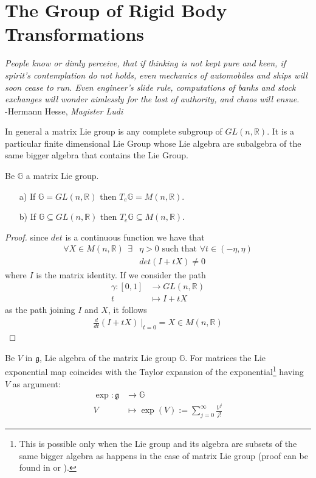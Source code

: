 
\chapter{The Group of Rigid Body Transformations}\label{ch:rigid_body_transformations}


\begin{flushright}
	\emph{People know or dimly perceive, that if thinking is not kept pure and keen, if spirit's contemplation do not holds, even mechanics of automobiles and ships will soon cease to run. Even engineer's slide rule, computations of banks and stock exchanges will wonder aimlessly for the lost of authority, and chaos will ensue.} \\ -Hermann Hesse, \emph{Magister Ludi}
\end{flushright}

In general a matrix Lie group is any complete subgroup of $GL(n,\mathbb{R})$. It is a particular finite dimensional Lie Group whose Lie algebra are subalgebra of the same bigger algebra that contains the Lie Group.
\begin{prop}\label{pr:matrixLiealgebra}
	Be $\mathbb{G}$ a matrix Lie group.
	\begin{itemize}
		\item[a)] If $\mathbb{G} = GL(n,\mathbb{R})$ then $T_{e}\mathbb{G} = M(n,\mathbb{R})$.  
		\item[b)] If $\mathbb{G} \subseteq GL(n,\mathbb{R})$ then $T_{e}\mathbb{G} \subseteq M(n,\mathbb{R})$.
	\end{itemize}
\end{prop}
\begin{proof}
	since $det$ is a continuous function we have that 
	\begin{align*}
	\forall X \in M(n,\mathbb{R})~~ \exists &\eta > 0 \text{ such that } \forall t \in(-\eta , \eta) \\
	&det(I+tX) \neq 0
	\end{align*}
	where $I$ is the matrix identity. If we consider the path
	\begin{align*}
	\gamma : [0,1] & \longrightarrow  GL(n,\mathbb{R}) \\
	t &\longmapsto I+tX
	\end{align*}
	as the path joining $I$ and $X$, it follows
	\begin{align*}
	\frac{d }{dt}(I+tX)~\Bigr|_{t = 0}  = X \in M(n,\mathbb{R})
	\end{align*}
\end{proof}

Be $V$ in $\mathfrak{g}$, Lie algebra of the matrix Lie group $\mathbb{G}$. For matrices the Lie exponential map coincides with the Taylor expansion of the exponential\footnote{This is possible only when the Lie group and its algebra are subsets of the same bigger algebra as happens in the case of matrix Lie group (proof can be found in \cite{kirillov} or \cite{hall}).} having $V$ as argument:
\begin{align*}
\exp : \mathfrak{g} & \longrightarrow  \mathbb{G}   \\
V &\longmapsto \exp(V) := \sum_{j=0}^{\infty} \frac{V^{j}}{j!}
\end{align*}

